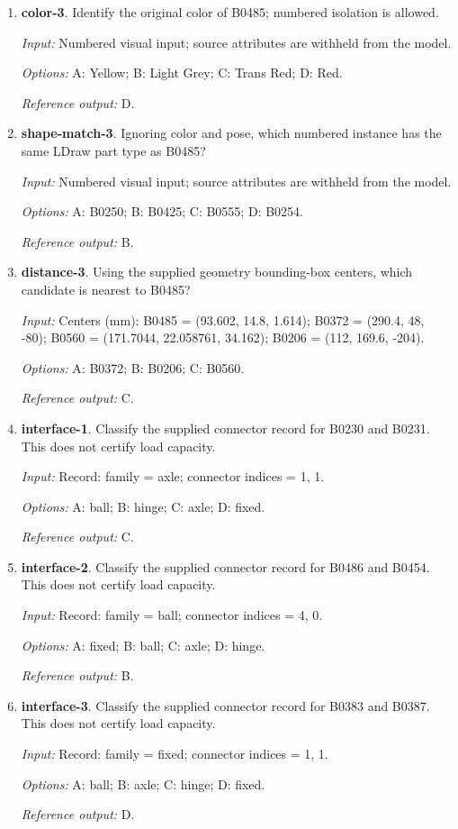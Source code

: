 \begin{enumerate}
\item \textbf{color-3}. Identify the original color of B0485; numbered isolation is allowed.\par {\small \textit{Input:} Numbered visual input; source attributes are withheld from the model. \par\textit{Options:} A: Yellow; B: Light Grey; C: Trans Red; D: Red. \par\textit{Reference output:} D.}
\item \textbf{shape-match-3}. Ignoring color and pose, which numbered instance has the same LDraw part type as B0485?\par {\small \textit{Input:} Numbered visual input; source attributes are withheld from the model. \par\textit{Options:} A: B0250; B: B0425; C: B0555; D: B0254. \par\textit{Reference output:} B.}
\item \textbf{distance-3}. Using the supplied geometry bounding-box centers, which candidate is nearest to B0485?\par {\small \textit{Input:} Centers (mm): B0485 = (93.602, 14.8, 1.614); B0372 = (290.4, 48, -80); B0560 = (171.7044, 22.058761, 34.162); B0206 = (112, 169.6, -204). \par\textit{Options:} A: B0372; B: B0206; C: B0560. \par\textit{Reference output:} C.}
\item \textbf{interface-1}. Classify the supplied connector record for B0230 and B0231. This does not certify load capacity.\par {\small \textit{Input:} Record: family = axle; connector indices = 1, 1. \par\textit{Options:} A: ball; B: hinge; C: axle; D: fixed. \par\textit{Reference output:} C.}
\item \textbf{interface-2}. Classify the supplied connector record for B0486 and B0454. This does not certify load capacity.\par {\small \textit{Input:} Record: family = ball; connector indices = 4, 0. \par\textit{Options:} A: fixed; B: ball; C: axle; D: hinge. \par\textit{Reference output:} B.}
\item \textbf{interface-3}. Classify the supplied connector record for B0383 and B0387. This does not certify load capacity.\par {\small \textit{Input:} Record: family = fixed; connector indices = 1, 1. \par\textit{Options:} A: ball; B: axle; C: hinge; D: fixed. \par\textit{Reference output:} D.}

\end{enumerate}
